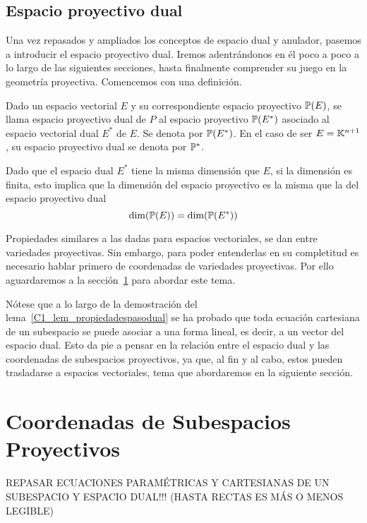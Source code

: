 \subsection{Espacio proyectivo dual}
Una vez repasados y ampliados los conceptos de espacio dual y anulador, pasemos a introducir el espacio proyectivo dual. Iremos adentrándonos en él poco a poco a lo largo de las siguientes secciones, hasta finalmente comprender su juego en la geometría proyectiva. Comencemos con una definición.
\begin{defi}
	Dado un espacio vectorial $E$ y su correspondiente espacio proyectivo $\mathbb{P}(E)$, se llama espacio proyectivo dual de $P$ al espacio proyectivo $\mathbb{P}(E^*)$ asociado al espacio vectorial dual $E^*$ de $E$. Se denota por $\mathbb{P}(E^*)$. En el caso de ser $E=\mathbb{K}^{n+1}$, su espacio proyectivo dual se denota por $\mathbb{P}^*$.
\end{defi}
\begin{obs}
	Dado que el espacio dual $E^*$ tiene la misma dimensión que $E$, si la dimensión es finita, esto implica que la dimensión del espacio proyectivo es la misma que la del espacio proyectivo dual
	\begin{equation*}
		\dim(\mathbb{P}(E))=\dim (\mathbb{P}(E^*))
	\end{equation*}
\end{obs}
Propiedades similares a las dadas para espacios vectoriales, se dan entre variedades proyectivas. Sin embargo, para poder entenderlas en su completitud es necesario hablar primero de coordenadas de variedades proyectivas. Por ello aguardaremos a la sección~\ref{C1_sec_coordenadasSubespacios} para abordar este tema.

Nótese que a lo largo de la demostración del lema~\ref{C1_lem_propiedadespasodual} se ha probado que toda ecuación cartesiana de un subespacio se puede asociar a una forma lineal, es decir, a un vector del espacio dual. Esto da pie a pensar en la relación entre el espacio dual y las coordenadas de subespacios proyectivos, ya que, al fin y al cabo, estos pueden trasladarse a espacios vectoriales, tema que abordaremos en la siguiente sección.

\section{Coordenadas de Subespacios Proyectivos}\label{C1_sec_coordenadasSubespacios}
REPASAR ECUACIONES PARAMÉTRICAS Y CARTESIANAS DE UN SUBESPACIO Y ESPACIO DUAL!!! (HASTA RECTAS ES MÁS O MENOS LEGIBLE)

